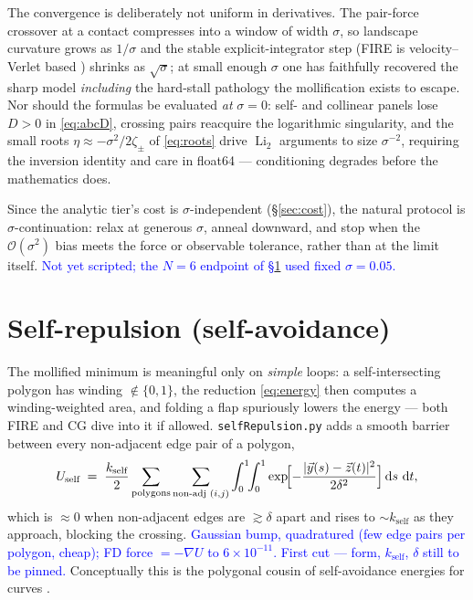 \documentclass[11pt]{article}
\newcommand{\aside}[1]{\textcolor{blue}{#1}}
\newcommand{\Li}{\operatorname{Li}_2}
\newcommand{\dd}{\,\mathrm{d}}
\begin{document}
The convergence is deliberately not uniform in derivatives.  The pair-force
crossover at a contact compresses into a window of width $\sigma$, so landscape
curvature grows as $1/\sigma$ and the stable explicit-integrator step (FIRE is
velocity--Verlet based \cite{Bitzek2006}) shrinks as $\sqrt\sigma$; at small enough
$\sigma$ one has faithfully recovered the sharp model \emph{including} the
hard-stall pathology the mollification exists to escape.  Nor should the formulas
be evaluated \emph{at} $\sigma=0$: self- and collinear panels lose $D>0$ in
\eqref{eq:abcD}, crossing pairs reacquire the logarithmic singularity, and the
small roots $\eta\approx-\sigma^2/2\zeta_\pm$ of \eqref{eq:roots} drive $\Li$
arguments to size $\sigma^{-2}$, requiring the inversion identity \cite{Lewin1981}
and care in float64 --- conditioning degrades before the mathematics does.

Since the analytic tier's cost is $\sigma$-independent (\S\ref{sec:cost}), the
natural protocol is $\sigma$-continuation: relax at generous $\sigma$, anneal
downward, and stop when the $\mathcal O(\sigma^2)$ bias meets the force or
observable tolerance, rather than at the limit itself.  \aside{Not yet scripted;
the $N=6$ endpoint of \S\ref{sec:selfrep} used fixed $\sigma=0.05$.}

\section{Self-repulsion (self-avoidance)}
\label{sec:selfrep}

The mollified minimum is meaningful only on \emph{simple} loops: a self-intersecting
polygon has winding $\notin\{0,1\}$, the reduction \eqref{eq:energy} then computes a
winding-weighted area, and folding a flap spuriously lowers the energy --- both FIRE
\cite{Bitzek2006} and CG dive into it if allowed.  \texttt{selfRepulsion.py} adds a
smooth barrier between every non-adjacent edge pair of a polygon,
\begin{equation}
  U_{\text{self}} \;=\; \frac{k_{\text{self}}}{2}\sum_{\text{polygons}}
  \sum_{\text{non-adj }(i,j)} \int_0^1\!\!\int_0^1
  \exp\!\Bigl[-\frac{|\vec y(s)-\vec z(t)|^2}{2\delta^2}\Bigr]\dd s\,\dd t ,
  \label{eq:Uself}
\end{equation}
which is $\approx0$ when non-adjacent edges are $\gtrsim\delta$ apart and rises to
$\sim k_{\text{self}}$ as they approach, blocking the crossing.  \aside{Gaussian
bump, quadratured (few edge pairs per polygon, cheap); FD force $=-\nabla U$ to
$6\times10^{-11}$.  First cut --- form, $k_{\text{self}}$, $\delta$ still to be
pinned.}  Conceptually this is the polygonal cousin of self-avoidance energies for
curves \cite{GonzalezMaddocks1999,YuSchumacherCrane2021}.
\end{document}
